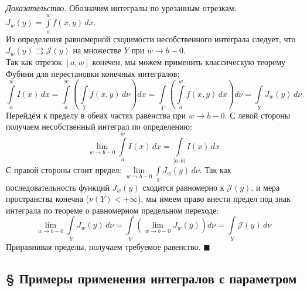 \documentclass[12pt,a4paper]{article}
\newenvironment{Proof}[1][Доказательство]{\vspace{0.5em}\noindent\textit{#1.}\hspace{0.5em}\ignorespaces}{\hfill$\blacksquare$\vspace{1em}}
\begin{document}
\begin{Proof}[Доказательство]
Обозначим интегралы по урезанным отрезкам: $J_w(y) = \int\limits_a^w f(x,y) \, dx$. \\
Из определения равномерной сходимости несобственного интеграла следует, что $J_w(y) \rightrightarrows \mathcal{J}(y)$ на множестве $Y$ при $w \to b-0$. \\
Так как отрезок $[a, w]$ конечен, мы можем применить классическую теорему Фубини для перестановки конечных интегралов:
$$ \int\limits_a^w I(x) \, dx = \int\limits_a^w \left( \int\limits_Y f(x,y) \, d\nu \right) dx = \int\limits_Y \left( \int\limits_a^w f(x,y) \, dx \right) d\nu = \int\limits_Y J_w(y) \, d\nu $$
Перейдём к пределу в обеих частях равенства при $w \to b-0$.
С левой стороны получаем несобственный интеграл по определению:
$$ \lim\limits_{w \to b-0} \int\limits_a^w I(x) \, dx = \int\limits_{[a,b)} I(x) \, dx $$
С правой стороны стоит предел: $\lim\limits_{w \to b-0} \int\limits_Y J_w(y) \, d\nu$. Так как последовательность функций $J_w(y)$ сходится равномерно к $\mathcal{J}(y)$, и мера пространства конечна ($\nu(Y) < +\infty$), мы имеем право внести предел под знак интеграла по теореме о равномерном предельном переходе:
$$ \lim\limits_{w \to b-0} \int\limits_Y J_w(y) \, d\nu = \int\limits_Y \left( \lim\limits_{w \to b-0} J_w(y) \right) d\nu = \int\limits_Y \mathcal{J}(y) \, d\nu $$
Приравнивая пределы, получаем требуемое равенство.
\end{Proof}



\subsection{§ Примеры применения интегралов с параметром}
\end{document}
